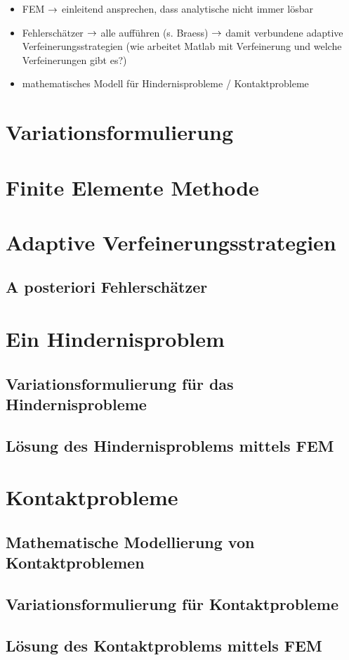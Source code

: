 \label{sec:Grundlagen}

\begin{itemize}
\item FEM $\rightarrow$ einleitend ansprechen, dass analytische nicht immer lösbar
\item Fehlerschätzer $\rightarrow$ alle aufführen (s. Braess) $\rightarrow$ damit verbundene adaptive Verfeinerungsstrategien (wie arbeitet Matlab mit Verfeinerung und welche Verfeinerungen gibt es?)
\item mathematisches Modell für Hindernisprobleme / Kontaktprobleme
\end{itemize}

\section{Variationsformulierung}

\section{Finite Elemente Methode}

\section{Adaptive Verfeinerungsstrategien}

\subsection{A posteriori Fehlerschätzer}

\section{Ein Hindernisproblem}

\subsection{Variationsformulierung für das Hindernisprobleme}

\subsection{Lösung des Hindernisproblems mittels FEM}

\section{Kontaktprobleme}

\subsection{Mathematische Modellierung von Kontaktproblemen}

\subsection{Variationsformulierung für Kontaktprobleme}

\subsection{Lösung des Kontaktproblems mittels FEM}

\newpage

